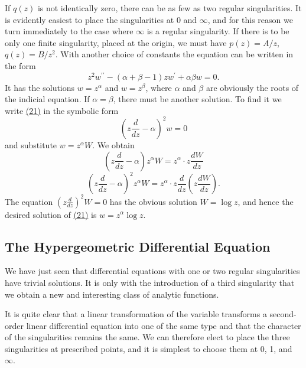 If $q(z)$ is not identically zero, there can be as few as two regular singularities. It is evidently easiest to place the singularities at 0 and $\infty$, and for this reason we turn immediately to the case where $\infty$ is a regular singularity. If there is to be only one finite singularity, placed at the origin, we must have $p(z) = A/z$, $q(z) = B/z^{2}$. With another choice of constants the equation can be written in the form
\begin{equation*}
z ^ {2} w ^ {\prime \prime} - (\alpha + \beta - 1) z w ^ {\prime} + \alpha \beta w = 0.\tag{21}\label{eq:8.21}
\end{equation*}
It has the solutions $w = z^{\alpha}$ and $w = z^{\beta}$, where $\alpha$ and $\beta$ are obviously the roots of the indicial equation. If $\alpha = \beta$, there must be another solution. To find it we write \hyperref[eq:8.21]{(21)} in the symbolic form
\begin{equation*}
\left(z \frac {d}{d z} - \alpha\right) ^ {2} w = 0
\end{equation*}
and substitute $w = z^{\alpha}W$. We obtain
\begin{equation*}
\left(z \frac {d}{d z} - \alpha\right) z ^ {\alpha} W = z ^ {\alpha} \cdot z \frac {d W}{d z}
\end{equation*}
\begin{equation*}
\left(z \frac {d}{d z} - \alpha\right) ^ {2} z ^ {\alpha} W = z ^ {\alpha} \cdot z \frac {d}{d z} \left(z \frac {d W}{d z}\right).
\end{equation*}
The equation $\left(z\frac{d}{dz}\right)^2 W = 0$ has the obvious solution $W = \log z$, and hence the desired solution of \hyperref[eq:8.21]{(21)} is $w = z^{\alpha} \log z$.

\setcounter{section}{4}\setcounter{subsection}{3}\subsection{The Hypergeometric Differential Equation}\label{sec:8.4.4}
We have just seen that differential equations with one or two regular singularities have trivial solutions. It is only with the introduction of a third singularity that we obtain a new and interesting class of analytic functions.

It is quite clear that a linear transformation of the variable transforms a second-order linear differential equation into one of the same type and that the character of the singularities remains the same. We can therefore elect to place the three singularities at prescribed points, and it is simplest to choose them at 0, 1, and $\infty$.

